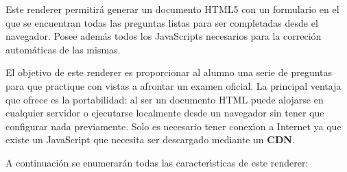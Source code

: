

Este renderer permitir\'a generar un documento HTML5 con un formulario en el que se encuentran todas las
preguntas listas para ser completadas desde el navegador. Posee adem\'as todos los JavaScripts necesarios
para la correci\'on autom\'aticas de las mismas.
\bigskip

El objetivo de este renderer es proporcionar al alumno una serie de preguntas para que practique con vistas
a afrontar un examen oficial. La principal ventaja que ofrece es la portabilidad: al ser un documento HTML puede
alojarse en cualquier servidor o ejecutarse localmente desde un navegador sin tener que configurar nada previamente.
Solo es necesario tener conex\'{\i}on a Internet ya que existe un JavaScript que necesita ser descargado mediante 
un {\bfseries CDN}.
\bigskip

A continuaci\'on se enumerar\'an todas las caracter\'{\i}sticas de este renderer:

